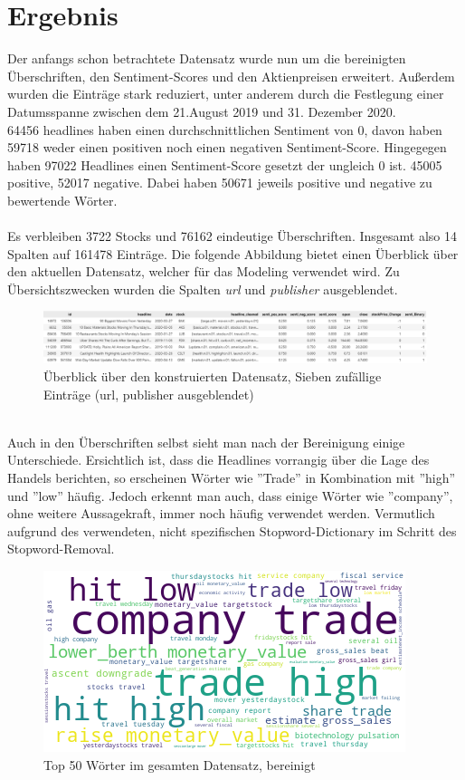 \section*{Ergebnis}
Der anfangs schon betrachtete Datensatz wurde nun um die bereinigten Überschriften, den Sentiment-Scores und den Aktienpreisen erweitert. Außerdem wurden die Einträge stark reduziert, unter anderem durch die Festlegung einer Datumsspanne zwischen dem 21.August 2019 und 31. Dezember 2020.\\ 
64456 headlines haben einen durchschnittlichen Sentiment von 0, davon haben 59718 weder einen positiven noch einen negativen Sentiment-Score. 
Hingegegen haben 97022 Headlines einen Sentiment-Score gesetzt der ungleich 0 ist. 45005 positive, 52017 negative. Dabei haben 50671 jeweils positive und negative zu bewertende Wörter.\\ \\
Es verbleiben 3722 Stocks und 76162 eindeutige Überschriften. Insgesamt also 14 Spalten auf 161478 Einträge.
Die folgende Abbildung bietet einen Überblick über den aktuellen Datensatz, welcher für das Modeling verwendet wird. Zu Übersichtszwecken wurden die Spalten \textit{url} und \textit{publisher} ausgeblendet.
\begin{figure}
    \includegraphics[width=1\textwidth]{img/dataSample7_constructed.png}
    \caption{Überblick über den konstruierten Datensatz, Sieben zufällige Einträge (url, publisher ausgeblendet)}
\end{figure} \\
Auch in den Überschriften selbst sieht man nach der Bereinigung einige Unterschiede. Ersichtlich ist, dass die Headlines vorrangig über die Lage des Handels berichten, so erscheinen Wörter wie ''Trade'' in Kombination mit ''high'' und ''low'' häufig. Jedoch erkennt man auch, dass einige Wörter wie ''company'', ohne weitere Aussagekraft, immer noch häufig verwendet werden. Vermutlich aufgrund des verwendeten, nicht spezifischen Stopword-Dictionary im Schritt des Stopword-Removal.
\begin{figure}
    \centering
    \includegraphics[scale=0.6]{img/wordcloud_afterCleaning.png}
    \caption{Top 50 Wörter im gesamten Datensatz, bereinigt}
\end{figure}